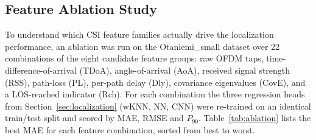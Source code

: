 \subsection{Feature Ablation Study}
\label{sec:ablation}

To understand which CSI feature families actually drive the localization
performance, an ablation was run on the Otaniemi\_small dataset over 22
combinations of the eight candidate feature groups: raw OFDM taps,
time-difference-of-arrival (TDoA), angle-of-arrival (AoA), received
signal strength (RSS), path-loss (PL), per-path delay (Dly), covariance
eigenvalues (CovE), and a LOS-reached indicator (Rch).
For each combination the three regression heads from
Section~\ref{sec:localization} (wKNN, NN, CNN) were re-trained on an
identical train/test split and scored by MAE, RMSE and $P_{90}$.
Table~\ref{tab:ablation} lists the best MAE for each feature combination,
sorted from best to worst.

